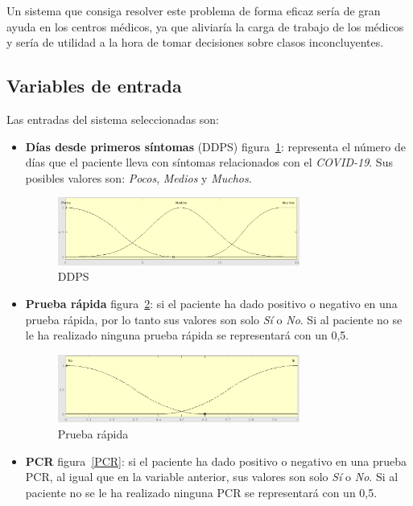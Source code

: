 \documentclass[12pt,a4paper, xcolor=table]{article}
\begin{document}
Un sistema que consiga resolver este problema de forma eficaz sería de gran ayuda en los centros médicos, ya que aliviaría la carga de trabajo de los médicos y sería de utilidad a la hora de tomar decisiones sobre clasos inconcluyentes.


\subsection{Variables de entrada}

Las entradas del sistema seleccionadas son:

\begin{itemize}
  \item \textbf{Días desde primeros síntomas} (DDPS) figura~\ref{DDPS}: representa el número de días que el paciente lleva con síntomas relacionados con el \textit{COVID-19}. Sus posibles valores son: \textit{Pocos}, \textit{Medios} y \textit{Muchos}.

  \begin{figure}[!h]
      \centering
      \includegraphics[width=300px]{img/dias_primeros_sintomas.png}
      \caption{DDPS}
      \label{DDPS}
  \end{figure}

  \item \textbf{Prueba rápida} figura~\ref{PR}: si el paciente ha dado positivo o negativo en una prueba rápida, por lo tanto sus valores son solo \textit{Sí} o \textit{No}. Si al paciente no se le ha realizado ninguna prueba rápida se representará con un 0,5.

  \begin{figure}[!h]
      \centering
      \includegraphics[width=300px]{img/prueba_rapida.png}
      \caption{Prueba rápida}
      \label{PR}
  \end{figure}

  \item \textbf{PCR} figura~\ref{PCR}: si el paciente ha dado positivo o negativo en una prueba PCR, al igual que en la variable anterior, sus valores son solo \textit{Sí} o \textit{No}. Si al paciente no se le ha realizado ninguna PCR se representará con un 0,5.


\end{itemize}
\end{document}
